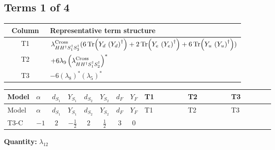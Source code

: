 \documentclass[8pt]{article}
\begin{document}
\begin{landscape}
\subsection*{Terms 1 of 4}
\begin{center}
\begin{tabular}{@{}c >{\raggedright\arraybackslash}p{0.82\linewidth}@{}}
\toprule
Column & Representative term structure \\
\midrule
T1 & \(\displaystyle {\lambda_{H H^\dagger S_1^\dagger S_2^\dagger}^{\rm Cross}} (6 \operatorname{Tr}\!\left({Y_d}\,\left({Y_d}\right)^{\dagger}\right)+2 \operatorname{Tr}\!\left({Y_e}\,\left({Y_e}\right)^{\dagger}\right)+6 \operatorname{Tr}\!\left({Y_u}\,\left({Y_u}\right)^{\dagger}\right))\) \\
\midrule
T2 & \(\displaystyle +6 {\lambda_{9}} \left({\lambda_{H H^\dagger S_1^\dagger S_2^\dagger}^{\rm Cross}}\right)^{*}\) \\
\midrule
T3 & \(\displaystyle -6 \left({\lambda_{8}}\right)^{*} \left({\lambda_5}\right)^{*}\) \\
\midrule
\bottomrule
\end{tabular}
\end{center}
\smallskip
\tiny
\begin{longtable}{@{}llcccccc >{\raggedright\arraybackslash}p{0.21\linewidth} >{\raggedright\arraybackslash}p{0.21\linewidth} >{\raggedright\arraybackslash}p{0.21\linewidth}@{}}
\toprule
Model & $\alpha$ & $d_{S_1}$ & $Y_{S_1}$ & $d_{S_2}$ & $Y_{S_2}$ & $d_F$ & $Y_F$ & T1 & T2 & T3 \\
\midrule
\endfirsthead
\toprule
Model & $\alpha$ & $d_{S_1}$ & $Y_{S_1}$ & $d_{S_2}$ & $Y_{S_2}$ & $d_F$ & $Y_F$ & T1 & T2 & T3 \\
\midrule
\endhead
T3-C & $-1$ & $2$ & $-\frac{1}{2}$ & $2$ & $\frac{1}{2}$ & $3$ & $0$ & \scriptsize\adjustbox{max width=\linewidth}{$\begin{gathered} {\lambda_{H H^\dagger S_1^\dagger S_2^\dagger}^{\rm Cross}} (6 \operatorname{Tr}\!\left({Y_d}\,\left({Y_d}\right)^{\dagger}\right)+2 \operatorname{Tr}\!\left({Y_e}\,\left({Y_e}\right)^{\dagger}\right)+6 \operatorname{Tr}\!\left({Y_u}\,\left({Y_u}\right)^{\dagger}\right))\end{gathered}$} & \scriptsize\adjustbox{max width=\linewidth}{$\begin{gathered} +6 {\lambda_{9}} \left({\lambda_{H H^\dagger S_1^\dagger S_2^\dagger}^{\rm Cross}}\right)^{*}\end{gathered}$} & \scriptsize\adjustbox{max width=\linewidth}{$\begin{gathered} -6 \left({\lambda_{8}}\right)^{*} \left({\lambda_5}\right)^{*}\end{gathered}$} \\
\midrule
\bottomrule
\end{longtable}
\clearpage
\noindent\textbf{Quantity: }$\lambda_{12}$\par\smallskip

\end{landscape}
\end{document}

